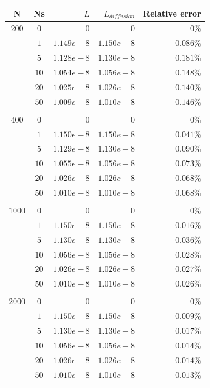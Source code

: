 \documentclass[review,nonatbib]{elsarticle}
\begin{document}
\begin{table}
    \centering
    \begin{tabular}{ c c r r r }
        N & Ns & $L$ & $L_{diffusion}$ & Relative error \\
        \hline
        $200$  & $0$  & $       0$ & $       0$ & $0\%$ \\
               & $1$  & $1.149e-8$ & $1.150e-8$ & $0.086\%$ \\
               & $5$  & $1.128e-8$ & $1.130e-8$ & $0.181\%$ \\
               & $10$ & $1.054e-8$ & $1.056e-8$ & $0.148\%$ \\
               & $20$ & $1.025e-8$ & $1.026e-8$ & $0.140\%$ \\
               & $50$ & $1.009e-8$ & $1.010e-8$ & $0.146\%$ \\
        \\
        $400$  & $0$  & $       0$ & $       0$ & $0\%$ \\
               & $1$  & $1.150e-8$ & $1.150e-8$ & $0.041\%$ \\
               & $5$  & $1.129e-8$ & $1.130e-8$ & $0.090\%$ \\
               & $10$ & $1.055e-8$ & $1.056e-8$ & $0.073\%$ \\
               & $20$ & $1.026e-8$ & $1.026e-8$ & $0.068\%$ \\
               & $50$ & $1.010e-8$ & $1.010e-8$ & $0.068\%$ \\
        \\
        $1000$ & $0$  & $       0$ & $       0$ & $0\%$ \\
               & $1$  & $1.150e-8$ & $1.150e-8$ & $0.016\%$ \\
               & $5$  & $1.130e-8$ & $1.130e-8$ & $0.036\%$ \\
               & $10$ & $1.056e-8$ & $1.056e-8$ & $0.028\%$ \\
               & $20$ & $1.026e-8$ & $1.026e-8$ & $0.027\%$ \\
               & $50$ & $1.010e-8$ & $1.010e-8$ & $0.026\%$ \\
        \\
        $2000$ & $0$  & $       0$ & $       0$ & $0\%$ \\
               & $1$  & $1.150e-8$ & $1.150e-8$ & $0.009\%$ \\
               & $5$  & $1.130e-8$ & $1.130e-8$ & $0.017\%$ \\
               & $10$ & $1.056e-8$ & $1.056e-8$ & $0.014\%$ \\
               & $20$ & $1.026e-8$ & $1.026e-8$ & $0.014\%$ \\
               & $50$ & $1.010e-8$ & $1.010e-8$ & $0.013\%$ \\
        \end{tabular}


\end{table}
\end{document}
